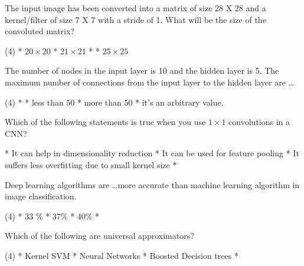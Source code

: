 \documentclass[11pt]{extarticle}
\begin{document}
\begin{exercise}
    The input image has been converted into a matrix of size 28 X 28 and a kernel/filter of size 7 X 7 with a stride of 1. What will be the size of the convoluted matrix?
    \begin{choice} (4)
        * \(20 \times 20\)
        * \(21 \times 21\)
        * 
        * \(25 \times 25\)
    \end{choice}
\end{exercise}
\begin{solution}
\end{solution}

\begin{exercise}
    The number of nodes in the input layer is 10 and the hidden layer is 5. The maximum number of connections from the input layer to the hidden layer are \dots
    \begin{choice} (4)
        * 
        * less than 50
        * more than 50
        * it's an arbitrary value.
    \end{choice}
\end{exercise}
\begin{solution}
\end{solution}

\begin{exercise}
    Which of the following statements is true when you use \(1\times 1\) convolutions in a CNN?
    \begin{choice}
        * It can help in dimensionality reduction
        * It can be used for feature pooling
        * It suffers less overfitting due to small kernel size
        * 
    \end{choice}
\end{exercise}
\begin{solution}
\end{solution}

\begin{exercise}
    Deep learning algorithms are \dots more accurate than machine learning algorithm in image classification.
    \begin{choice} (4)
        * 33 \%
        * 37\%
        * 40\%
        * 
    \end{choice}
\end{exercise}
\begin{solution}
\end{solution}

\begin{exercise}
    Which of the following are universal approximators?
    \begin{choice} (4)
        * Kernel SVM
        * Neural Networks
        * Boosted Decision trees
        * 
    \end{choice}
\end{exercise}
\begin{solution}
\end{solution}
\end{document}
